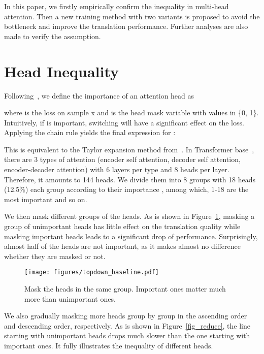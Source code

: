 \documentclass[11pt]{article}
\begin{document}
In this paper, we firstly empirically confirm the inequality in multi-head attention. Then a new training method with two variants 
is proposed to avoid the bottleneck and improve the translation performance. Further analyses are also made to verify the assumption.



\section{Head Inequality}


Following~, we define the importance of an attention head  as 











where  is the loss on sample x and  is the head mask variable with values in \{0, 1\}. Intuitively, if  is important, switching  will have a significant effect on the loss. Applying the chain rule yields the final expression for :



This is equivalent to the Taylor expansion method from~.
In Transformer base~\cite{Vaswani2017AttentionIA}, there are 3 types of attention (encoder self attention, decoder self attention, encoder-decoder attention) with 6 layers per type and 8 heads per layer. Therefore, it amounts to 144 heads. 
We divide them into 8 groups with 18 heads (12.5\%) each group according to their importance , among which, 1-18 are the most important and so on.



We then mask different groups of the heads. As is shown in Figure~\ref{fig_maskhead}, masking a group of unimportant heads has little effect on the translation quality while masking important heads leads to a significant drop of performance. Surprisingly, almost half of the heads are not important, as it makes almost no difference whether they are masked or not.



\begin{figure}[h]
    \centering
    \texttt{[image: figures/topdown\_baseline.pdf]}
    \caption{Mask the heads in the same group. Important ones matter much more than unimportant ones.}
\label{fig_maskhead}
\end{figure}

We also gradually masking more heads group by group in the ascending order and descending order, respectively. As is shown in Figure~\ref{fig_reduce}, the line starting with unimportant heads drops much slower than the one starting with important ones. It fully illustrates the inequality of different heads.
\end{document}
